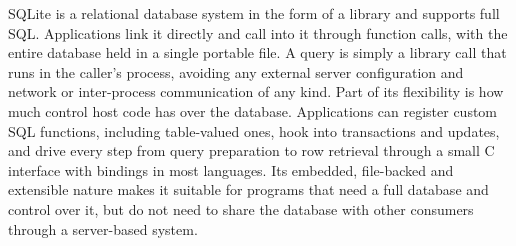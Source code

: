 SQLite is a relational database system in the form of a library and supports full SQL.
Applications link it directly and call into it through function calls,
with the entire database held in a single portable file.
A query is simply a library call that runs in the caller's process,
avoiding any external server configuration
and network or inter-process communication of any kind.
Part of its flexibility is how much control host code has over the database.
Applications can register custom SQL functions, including table-valued ones,
hook into transactions and updates, and drive every step from query preparation
to row retrieval through a small C interface with bindings in most languages.
Its embedded, file-backed and extensible nature makes it suitable for
programs that need a full database and control over it,
but do not need to share the database with other consumers
through a server-based system.

